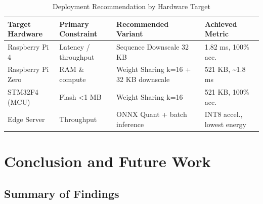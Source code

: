 \documentclass[12pt,a4paper]{article}
\begin{document}
\begin{table}[h!]
\centering
\caption{Deployment Recommendation by Hardware Target}
\renewcommand{\arraystretch}{1.4}
\begin{tabular}{L{3.2cm} L{3cm} L{3.5cm} L{4cm}}
\toprule
{}
\color{white}\textbf{Target Hardware} &
\color{white}\textbf{Primary Constraint} &
\color{white}\textbf{Recommended Variant} &
\color{white}\textbf{Achieved Metric} \\
\midrule
Raspberry Pi 4 & Latency / throughput & Sequence Downscale 32 KB & 1.82 ms, 100\% acc. \\
Raspberry Pi Zero & RAM \& compute & Weight Sharing k=16 + 32 KB downscale & 521 KB, \textasciitilde 1.8 ms \\
STM32F4 (MCU) & Flash \textless 1 MB & Weight Sharing k=16 & 521 KB, 100\% acc. \\
Edge Server & Throughput & ONNX Quant + batch inference & INT8 accel., lowest energy \\
\bottomrule
\end{tabular}
\end{table}

\section{Conclusion and Future Work}

\subsection{Summary of Findings}
\end{document}
